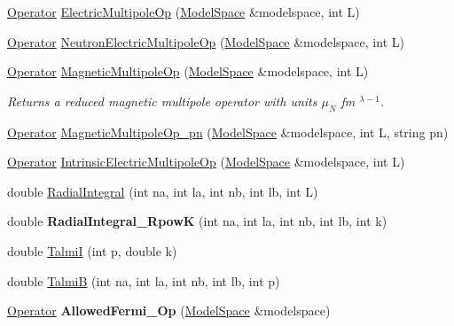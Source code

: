 \begin{DoxyCompactItemize}
\hyperlink{classOperator}{Operator} \hyperlink{namespaceimsrg__util_ac9117a9e43ab4994cd28e9eebeb845ac}{Electric\+Multipole\+Op} (\hyperlink{classModelSpace}{Model\+Space} \&modelspace, int L)
\item 
\hyperlink{classOperator}{Operator} \hyperlink{namespaceimsrg__util_a0845fbd56e8ec3b3e6ff84c2d41297ca}{Neutron\+Electric\+Multipole\+Op} (\hyperlink{classModelSpace}{Model\+Space} \&modelspace, int L)
\item 
\mbox{\label{namespaceimsrg__util_ab52404f4fc6fd06cb2579b4c7a5212fa}} 
\hyperlink{classOperator}{Operator} \hyperlink{namespaceimsrg__util_ab52404f4fc6fd06cb2579b4c7a5212fa}{Magnetic\+Multipole\+Op} (\hyperlink{classModelSpace}{Model\+Space} \&modelspace, int L)
\begin{DoxyCompactList}\small\item\em Returns a reduced magnetic multipole operator with units $ \mu_{N}$ fm $ ^{\lambda-1} $. \end{DoxyCompactList}\item 
\hyperlink{classOperator}{Operator} \hyperlink{namespaceimsrg__util_ad8388f2d1ee6937ea106fcc59c9aeb1a}{Magnetic\+Multipole\+Op\+\_\+pn} (\hyperlink{classModelSpace}{Model\+Space} \&modelspace, int L, string pn)
\item 
\hyperlink{classOperator}{Operator} \hyperlink{namespaceimsrg__util_a1360d9a1bfc4b4f99f64078f50f47c3d}{Intrinsic\+Electric\+Multipole\+Op} (\hyperlink{classModelSpace}{Model\+Space} \&modelspace, int L)
\item 
double \hyperlink{namespaceimsrg__util_ae3faffcf58cb8213b3e41533a0cd87d3}{Radial\+Integral} (int na, int la, int nb, int lb, int L)
\item 
\mbox{\label{namespaceimsrg__util_ad4c1c6fb8a28d60053eb7e023ebcbe55}} 
double {\bfseries Radial\+Integral\+\_\+\+RpowK} (int na, int la, int nb, int lb, int k)
\item 
double \hyperlink{namespaceimsrg__util_abbae76adb7379aa8c1b9f95a74514aef}{TalmiI} (int p, double k)
\item 
double \hyperlink{namespaceimsrg__util_a817428b9475c73e39f5db8173de9c182}{TalmiB} (int na, int la, int nb, int lb, int p)
\item 
\mbox{\label{namespaceimsrg__util_a3636d44cf1b0ad5372f9d36263dfdc6b}} 
\hyperlink{classOperator}{Operator} {\bfseries Allowed\+Fermi\+\_\+\+Op} (\hyperlink{classModelSpace}{Model\+Space} \&modelspace)

\end{DoxyCompactItemize}
